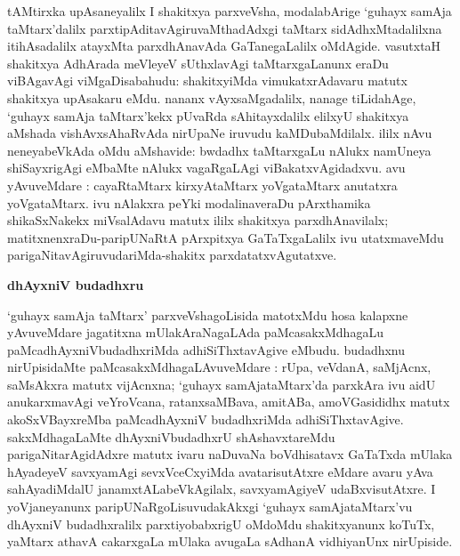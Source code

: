 tAMtirxka upAsaneyalilx I shakitxya parxveVsha, modalabArige `guhayx samAja taMtarx'dalilx parxtipAditavAgiruvaMthadAdxgi taMtarx sidAdhxMtadalilxna itihAsadalilx atayxMta parxdhAnavAda GaTanegaLalilx oMdAgide. vasutxtaH shakitxya AdhArada meVleyeV sUthxlavAgi taMtarxgaLanunx eraDu viBAgavAgi viMgaDisabahudu: shakitxyiMda vimukatxrAdavaru matutx shakitxya upAsakaru eMdu. nananx vAyxsaMgadalilx, nanage tiLidahAge, `guhayx samAja taMtarx'kekx pUvaRda sAhitayxdalilx elilxyU shakitxya aMshada vishAvxsAhaRvAda nirUpaNe iruvudu kaMDubaMdilalx. ililx nAvu neneyabeVkAda oMdu aMshavide: bwdadhx taMtarxgaLu nAlukx namUneya shiSayxrigAgi eMbaMte nAlukx vagaRgaLAgi viBakatxvAgidadxvu. avu yAvuveMdare :  cayaRtaMtarx  kirxyAtaMtarx  yoVgataMtarx  anutatxra yoVgataMtarx. ivu nAlakxra peYki modalinaveraDu pArxthamika shikaSxNakekx miVsalAdavu matutx ililx shakitxya parxdhAnavilalx; matitxnenxraDu-paripUNaRtA pArxpitxya GaTaTxgaLalilx ivu utatxmaveMdu parigaNitavAgiruvudariMda-shakitx parxdatatxvAgutatxve. 

\smallskip
\begin{center}
{\Large\bf dhAyxniV budadhxru}
\end{center}

`guhayx samAja taMtarx' parxveVshagoLisida matotxMdu hosa kalapxne yAvuveMdare jagatitxna mUlakAraNagaLAda paMcasakxMdhagaLu paMcadhAyxniVbudadhxriMda adhiSiThxtavAgive eMbudu. budadhxnu nirUpisidaMte paMcasakxMdhagaLAvuveMdare : rUpa, veVdanA, saMjAcnx, saMsAkxra matutx vijAcnxna; `guhayx samAjataMtarx'da parxkAra ivu aidU anukarxmavAgi veYroVcana, ratanxsaMBava, amitABa, amoVGasididhx matutx akoSxVBayxreMba paMcadhAyxniV budadhxriMda adhiSiThxtavAgive. sakxMdhagaLaMte dhAyxniVbudadhxrU shAshavxtareMdu parigaNitarAgidAdxre matutx ivaru naDuvaNa boVdhisatavx GaTaTxda mUlaka hAyadeyeV savxyamAgi sevxVceCxyiMda avatarisutAtxre eMdare avaru yAva sahAyadiMdalU janamxtALabeVkAgilalx, savxyamAgiyeV udaBxvisutAtxre. I yoVjaneyanunx paripUNaRgoLisuvudakAkxgi `guhayx samAjataMtarx'vu dhAyxniV budadhxralilx parxtiyobabxrigU oMdoMdu shakitxyanunx koTuTx, yaMtarx athavA cakarxgaLa mUlaka avugaLa sAdhanA vidhiyanUnx nirUpiside.

